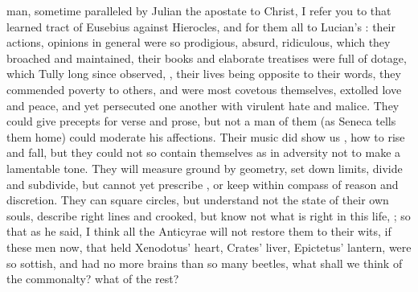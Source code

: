 man, sometime paralleled by Julian the apostate to Christ, I refer you to that
learned tract of Eusebius against Hierocles, and for them all to Lucian's
: their actions,
opinions in general were so prodigious, absurd, ridiculous, which they broached
and maintained, their books and elaborate treatises were full of dotage, which
Tully  long since observed, , their lives being opposite to their
words, they commended poverty to others, and were most covetous themselves,
extolled love and peace, and yet persecuted one another with virulent hate and
malice. They could give precepts for verse and prose, but not a man of them (as
Seneca tells them home) could moderate his affections.
Their music did show us , \etc{} how to rise and fall, but
they could not so contain themselves as in adversity not to make a lamentable
tone. They will measure ground by geometry, set down limits, divide and
subdivide, but cannot yet prescribe , or keep within
compass of reason and discretion. They can square circles, but understand not
the state of their own souls, describe right lines and crooked, \etc{} but know
not what is right in this life, ; so that
as he said,  I think all
the Anticyrae will not restore them to their wits, if these
men now, that held Xenodotus' heart, Crates' liver,
Epictetus' lantern, were so sottish, and had no more brains than so many
beetles, what shall we think of the commonalty? what of the rest?

